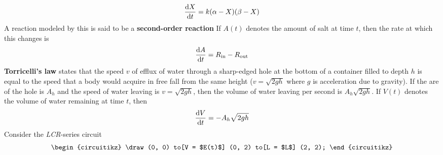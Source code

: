 \documentclass[../Differential Equations.tex]{subfiles}
\begin{document}
				\[\dv{X}{t} = k(\alpha - X)(\beta - X)\]
				A reaction modeled by this is said to be a \textbf{second-order reaction}
			If \(A(t)\) denotes the amount of salt at time \(t\), then the rate at which this changes is
				\[\dv{A}{t} = R_{\text{in}} - R_{\text{out}}\]
			\textbf{Torricelli's law} states that the speed \(v\) of efflux of water through a sharp-edged hole at the bottom of a container filled to depth \(h\) is equal to the speed that a body would acquire in free fall from the same height (\(v = \sqrt{2gh}\) where \(g\) is acceleration due to gravity). If the are of the hole is \(A_h\) and the speed of water leaving is \(v = \sqrt{2gh}\), then the volume of water leaving per second is \(A_h\sqrt{2gh}\). If \(V(t)\) denotes the volume of water remaining at time \(t\), then
				\[\dv{V}{t} = -A_h\sqrt{2gh}\]
			Consider the \textit{LCR}-series circuit
				\[\begin{circuitikz}
					\draw (0, 0)
						to[V = $E(t)$] (0, 2)
						to[L = $L$] (2, 2);
				\end{circuitikz}\]
\end{document}
